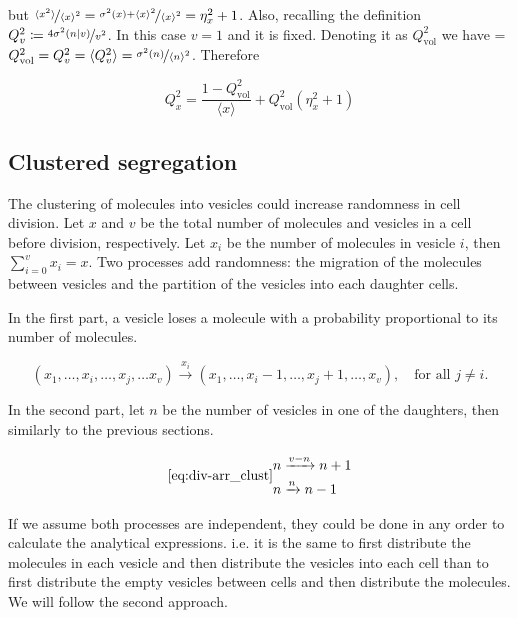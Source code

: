 but $\nicefrac{\langle x^2\rangle}{\langle x\rangle^2} = \nicefrac{\sigma^2(x) + \langle x\rangle^2}{\langle x\rangle^2} = \eta_x^2 + 1$. Also, recalling the definition  $Q_v^2 \coloneqq \nicefrac{4\sigma^2(n|v)}{v^2}$. In this case $v=1$ and it is fixed. Denoting it as $Q^2_\text{vol}$ we have = $Q^2_\text{vol} = Q_v^2 = \langle Q_v^2\rangle = \nicefrac{\sigma^2(n)}{\langle n\rangle^2}$. Therefore

\begin{equation}
  \boxed{Q_x^2 = \frac{1-Q_\text{vol}^2}{\langle x\rangle} + Q_\text{vol}^2(\eta^2_x+1)}
\end{equation}

\subsection{Clustered segregation}

The clustering of molecules into vesicles could increase randomness in cell division. Let $x$ and $v$ be the total number of molecules and vesicles in a cell before division, respectively. Let $x_i$ be the number of molecules in vesicle $i$, then $\sum_{i=0}^vx_i=x$. Two processes add randomness: the migration of the molecules between vesicles and the partition of the vesicles into each daughter cells.

In the first part, a vesicle loses a molecule with a probability proportional to its number of molecules.

\begin{equation}
  \label{eq:div-vesicle_switch}
  (x_1,\dotsc,x_i,\dotsc,x_j,\dotsc x_v) \xrightarrow{x_i} (x_1,\dotsc,x_i-1,\dotsc,x_j+1,\dotsc, x_v),\quad \text{for all } j\neq i.
\end{equation}

In the second part, let $n$ be the number of vesicles in one of the daughters, then similarly to the previous sections.

\begin{equation}
   \eqref{eq:div-arr_clust}
  \begin{split}
    n &\xrightarrow{v-n} n+1\\
    n &\xrightarrow{n} n-1
  \end{split}
\end{equation}

If we assume both processes are independent, they could be done in any order to calculate the analytical expressions. i.e. it is the same to first distribute the molecules in each vesicle and then distribute the vesicles into each cell than to first distribute the empty vesicles between cells and then distribute the molecules. We will follow the second approach.

